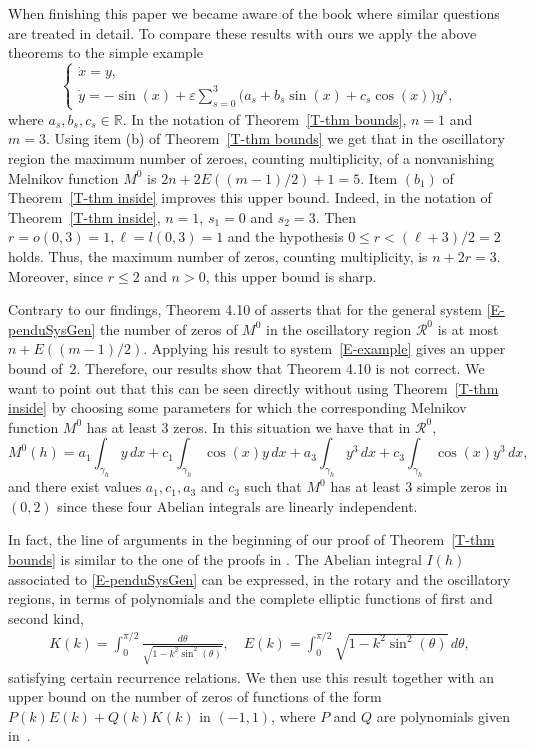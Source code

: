 \documentclass[12pt,psamsfonts]{amsart}
\begin{document}
 When finishing this paper we became aware of the book \cite{Morozov} where similar questions are
treated in detail.  To compare these results with ours we apply the above theorems to the simple
example
\begin{equation}\label{E-example}
           {
  \left\{\!
   \begin{array}{l}
    \dot x={y,} \\[2pt] \dot y={-\sin( x)+ {\varepsilon} \sum_{s=0}^{3}\big(a_s+b_s\sin(x)+c_s\cos (x)\big)y^s,}
   \end{array}
  \right.
}
     \end{equation}
where $a_s,b_s,c_s\in{\mathbb{R}}.$ In the notation of Theorem~\ref{T-thm bounds}, $n=1$ and $m=3.$ Using item (b) of Theorem~\ref{T-thm bounds}  we get that in the oscillatory region the maximum number of zeroes, counting multiplicity, of a
nonvanishing Melnikov function $M^0$ is $2n+ 2  E(( m  -1)/2)+1=5.$  Item $(b_1)$ of Theorem~\ref{T-thm inside} improves this upper bound.  Indeed, in the notation of Theorem~\ref{T-thm inside}, $n=1$, $s_1=0$ and $s_2=3$. Then
$r=o(0,3)=1, \ell=l(0,3)=1$ and the hypothesis $0\le r <  (\ell+3)/2=2$ holds. Thus, the maximum
number of zeros, counting  multiplicity, is $n+2r=3$. Moreover, since $r\le2$
and $n>0$, this upper bound is sharp.

Contrary to our findings, Theorem 4.10 of \cite[p. 135]{Morozov} asserts that for the general
system \eqref{E-penduSysGen} the number of zeros of $M^0$ in the oscillatory region
$\mathcal{R}^0$ is at most $n+E((m-1)/2)$. Applying his result to system~\eqref{E-example} gives
an upper bound of~$2.$ Therefore, our results show that Theorem 4.10 is not correct. We want to
point out that this can be seen directly  without using Theorem~\ref{T-thm inside} by choosing some parameters for
which the corresponding Melnikov function $M^0$ has at  least 3 zeros. In this
situation we have that in $\mathcal{R}^0$,
\[
M^0(h)=a_1  \int_{{\gamma}_h} y \, dx+ c_1  \int_{{\gamma}_h} \cos(x) y \, dx+ a_3 \int_{{\gamma}_h}  y^3 \, dx+ c_3
\int_{{\gamma}_h} \cos(x) y^3 \, dx,
\]
and there exist values $a_1,c_1,a_3$ and $c_3$ such that $M^0$ has at least 3  simple zeros in
$(0,2)$ since these four Abelian integrals are linearly independent.

\smallbreak

In fact, the line of arguments in the beginning of our proof of Theorem~\ref{T-thm bounds} is similar to the one of the proofs in
\cite{Morozov1989,Morozov}. The Abelian integral $I(h)$ associated to \eqref{E-penduSysGen} can be expressed, in the rotary and the oscillatory regions, in terms of polynomials and the complete elliptic functions of
first and second kind,
\begin{align}
\label{E-Elliptic}
    K(k) =  \int_0^{\pi/2}\frac{d\theta}{\sqrt{1-k^2\sin^2(\theta)}}, \quad
     E(k) =  \int_0^{\pi/2} \sqrt{1-k^2\sin^2(\theta)}\,d\theta,
\end{align}
satisfying certain recurrence relations.  We then use this result together
with an upper bound on the number of zeros of functions of the form $P(k)E(k)+Q(k)K(k)$ in $(-1,1)$, where $P$ and $Q$ are polynomials given  in~\cite{Gasull2002}.
\end{document}
